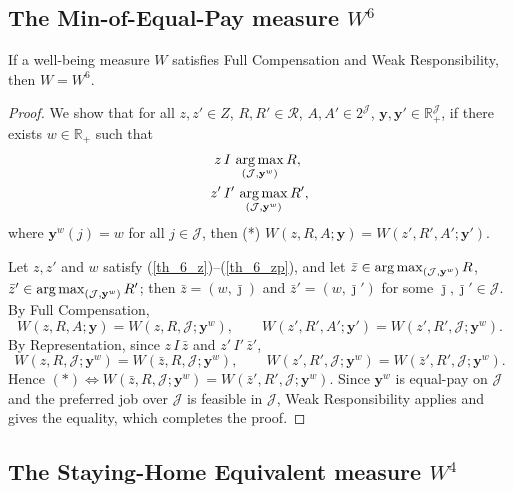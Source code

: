 \subsection{The Min-of-Equal-Pay measure $W^6$}

\begin{theorem}
\label{thm:w6}
If a well-being measure $W$ satisfies Full Compensation and Weak
Responsibility, then $W=W^6$.
\end{theorem}

\begin{proof}
We show that for all $z,z'\in Z$, $R,R'\in\mathcal R$, $A,A'\in 2^{\mathcal J}$,
$\mathbf y,\mathbf y'\in\mathbb R_+^{\mathcal J}$, if there exists
$w\in\mathbb R_+$ such that
\begin{align}
z\,&I\,\operatorname*{arg\,max}_{(\mathcal J,\mathbf y^w)}R, \label{th_6_z}\\
z'\,&I'\,\operatorname*{arg\,max}_{(\mathcal J,\mathbf y^w)}R', \label{th_6_zp}
\end{align}
where $\mathbf y^w(j)=w$ for all $j\in\mathcal J$, then (*)
$W(z,R,A;\mathbf y)=W(z',R',A';\mathbf y')$.

Let $z,z'$ and $w$ satisfy (\ref{th_6_z})--(\ref{th_6_zp}), and let
$\bar z\in\operatorname*{arg\,max}_{(\mathcal J,\mathbf y^w)}R$,
$\bar z'\in\operatorname*{arg\,max}_{(\mathcal J,\mathbf y^w)}R'$; then $\bar z=(w,\bar\jmath)$ and
$\bar z'=(w,\bar\jmath')$ for some $\bar\jmath,\bar\jmath'\in\mathcal J$. By Full
Compensation,
\begin{equation*}
W(z,R,A;\mathbf y)=W(z,R,\mathcal J;\mathbf y^w),\qquad
W(z',R',A';\mathbf y')=W(z',R',\mathcal J;\mathbf y^w).
\end{equation*}
By Representation, since $z\,I\,\bar z$ and $z'\,I'\,\bar z'$,
\begin{equation*}
W(z,R,\mathcal J;\mathbf y^w)=W(\bar z,R,\mathcal J;\mathbf y^w),\qquad
W(z',R',\mathcal J;\mathbf y^w)=W(\bar z',R',\mathcal J;\mathbf y^w).
\end{equation*}
Hence $(*)\Leftrightarrow W(\bar z,R,\mathcal J;\mathbf y^w)=W(\bar
z',R',\mathcal J;\mathbf y^w)$. Since $\mathbf y^w$ is equal-pay on
$\mathcal J$ and the preferred job over $\mathcal J$ is feasible in
$\mathcal J$, Weak Responsibility applies and gives the equality, which
completes the proof.
\end{proof}

\subsection{The Staying-Home Equivalent measure $W^4$}

